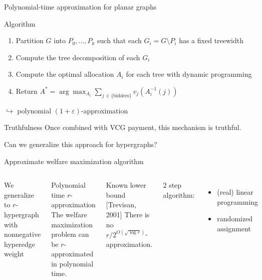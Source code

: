 \documentclass[aspectratio=169]{beamer}
\begin{document}
\begin{frame}{Polynomial-time approximation for planar graphs}
    \begin{block}{Algorithm}
        \begin{enumerate}
            \item \alert{Partition} $G$ into $P_0, \dots, P_k$ such that each $G_i = G \setminus P_i$ has a \alert{fixed treewidth}
            \item Compute the \alert{tree decomposition} of each $G_i$
            \item Compute the optimal allocation $A_i$ for each tree with \alert{dynamic programming}
            \item Return $A^* = \arg \max_{A_i} \sum_{j \,\in \{\text{bidders}\}} v_j(A_i^{-1}(j))$
        \end{enumerate}
    \end{block}

    $\hookrightarrow$ polynomial \alert{$(1 + \varepsilon)$-approximation}

    \begin{block}{Truthfulness}
        Once combined with \alert{VCG payment}, this mechanism is \alert{truthful}.
    \end{block}
\end{frame}

\begin{frame}[standout]
    Can we generalize this approach for \alert{hypergraphs}?
\end{frame}

\begin{frame}{Approximate welfare maximization algorithm}
    \begin{columns}
        We generalize to \(r\)-hypergraph with \alert{nonnegative hyperedge weight}

        \begin{block}{Polynomial time \(r\)-approximation}
            The welfare maximization problem can be \(r\)-approximated in polynomial time.
        \end{block}

        \begin{block}{Known lower bound [Trevisan, 2001]}
            There is no \(r/2^{O(\sqrt{\log r})}\)-approximation.
        \end{block}

        2 step algorithm:
        \begin{itemize}
            \item (real) linear programming
            \item randomized assignment
        \end{itemize}
    \end{columns}
\end{frame}
\end{document}
